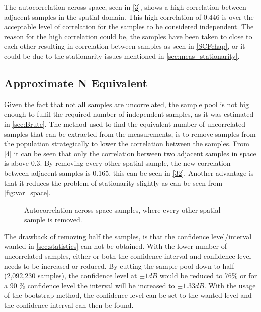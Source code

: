 The autocorrelation across space, seen in \autoref{3}, shows a high correlation between adjacent samples in the spatial domain. This high correlation of 0.446 is over the acceptable level of correlation for the samples to be considered independent. The reason for the high correlation could be, the samples have been taken to close to each other resulting in correlation between samples as seen in \autoref{SCFchap}, or it could be due to the stationarity issues mentioned in \autoref{sec:meas_stationarity}.


\subsection{Approximate N Equivalent}\label{approxN}


Given the fact that not all samples are uncorrelated, the sample pool is not big enough to fulfil the required number of independent samples, as it was estimated in \autoref{sec:Brute}. The method used to find the equivalent number of uncorrelated samples that can be extracted from the measurements, is to remove samples from the population strategically to lower the correlation between the samples. From \autoref{4} it can be seen that only the correlation between two adjacent samples in space is above 0.3. By removing every other spatial sample, the new correlation between adjacent samples is 0.165, this can be seen in \autoref{32}. Another advantage is that it reduces the problem of stationarity slightly as can be seen from \autoref{fig:var_space}.


\begin{figure}[H]
\begin{center}

\caption{Autocorrelation across space samples, where every other spatial sample is removed.}
\label{32}
\end{center}
\end{figure}

The drawback of removing half the samples, is that the confidence level/interval wanted in \autoref{sec:statistics} can not be obtained. With the lower number of uncorrelated samples, either or both the confidence interval and confidence level needs to be increased or reduced. By cutting the sample pool down to half (2,092,230 samples), the confidence level at $\pm 1dB$ would be reduced to 76\% or for a 90 \% confidence level the interval will be increased to $\pm 1.33dB$. With the usage of the bootstrap method, the confidence level can be set to the wanted level and the confidence interval can then be found.




